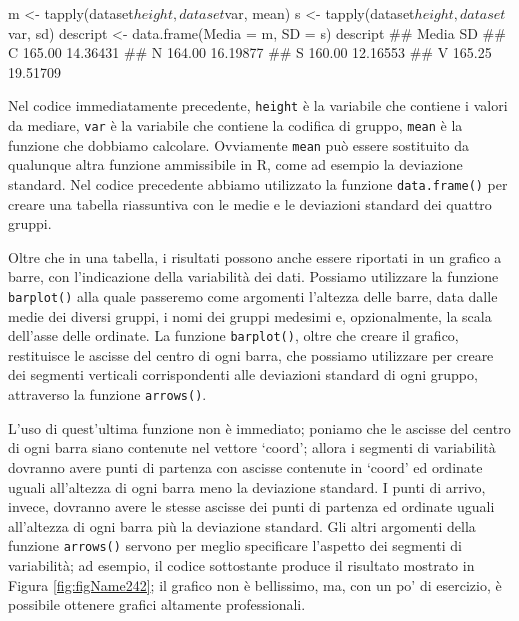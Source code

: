 \documentclass[a4paper,12pt,oneside]{book}
\newenvironment{Shaded}{\begin{snugshade}}{\end{snugshade}}
\newcommand{\SpecialCharTok}[1]{#1}
\newcommand{\DocumentationTok}[1]{#1}
\newcommand{\OtherTok}[1]{#1}
\newcommand{\FunctionTok}[1]{#1}
\newcommand{\AttributeTok}[1]{#1}
\newcommand{\NormalTok}[1]{#1}
\begin{document}
\begin{Shaded}
\begin{Highlighting}[]
\NormalTok{m }\OtherTok{\textless{}{-}} \FunctionTok{tapply}\NormalTok{(dataset}\SpecialCharTok{$}\NormalTok{height, dataset}\SpecialCharTok{$}\NormalTok{var, mean)}
\NormalTok{s }\OtherTok{\textless{}{-}} \FunctionTok{tapply}\NormalTok{(dataset}\SpecialCharTok{$}\NormalTok{height, dataset}\SpecialCharTok{$}\NormalTok{var, sd)}
\NormalTok{descript }\OtherTok{\textless{}{-}} \FunctionTok{data.frame}\NormalTok{(}\AttributeTok{Media =}\NormalTok{ m, }\AttributeTok{SD =}\NormalTok{ s)}
\NormalTok{descript}
\DocumentationTok{\#\#    Media       SD}
\DocumentationTok{\#\# C 165.00 14.36431}
\DocumentationTok{\#\# N 164.00 16.19877}
\DocumentationTok{\#\# S 160.00 12.16553}
\DocumentationTok{\#\# V 165.25 19.51709}
\end{Highlighting}
\end{Shaded}

Nel codice immediatamente precedente, \texttt{height} è la variabile che contiene i valori da mediare, \texttt{var} è la variabile che contiene la codifica di gruppo, \texttt{mean} è la funzione che dobbiamo calcolare. Ovviamente \texttt{mean} può essere sostituito da qualunque altra funzione ammissibile in R, come ad esempio la deviazione standard. Nel codice precedente abbiamo utilizzato la funzione \texttt{data.frame()} per creare una tabella riassuntiva con le medie e le deviazioni standard dei quattro gruppi.

Oltre che in una tabella, i risultati possono anche essere riportati in un grafico a barre, con l'indicazione della variabilità dei dati. Possiamo utilizzare la funzione \texttt{barplot()} alla quale passeremo come argomenti l'altezza delle barre, data dalle medie dei diversi gruppi, i nomi dei gruppi medesimi e, opzionalmente, la scala dell'asse delle ordinate. La funzione \texttt{barplot()}, oltre che creare il grafico, restituisce le ascisse del centro di ogni barra, che possiamo utilizzare per creare dei segmenti verticali corrispondenti alle deviazioni standard di ogni gruppo, attraverso la funzione \texttt{arrows()}.

L'uso di quest'ultima funzione non è immediato; poniamo che le ascisse del centro di ogni barra siano contenute nel vettore `coord'; allora i segmenti di variabilità dovranno avere punti di partenza con ascisse contenute in `coord' ed ordinate uguali all'altezza di ogni barra meno la deviazione standard. I punti di arrivo, invece, dovranno avere le stesse ascisse dei punti di partenza ed ordinate uguali all'altezza di ogni barra più la deviazione standard. Gli altri argomenti della funzione \texttt{arrows()} servono per meglio specificare l'aspetto dei segmenti di variabilità; ad esempio, il codice sottostante produce il risultato mostrato in Figura \ref{fig:figName242}; il grafico non è bellissimo, ma, con un po' di esercizio, è possibile ottenere grafici altamente professionali.
\end{document}
